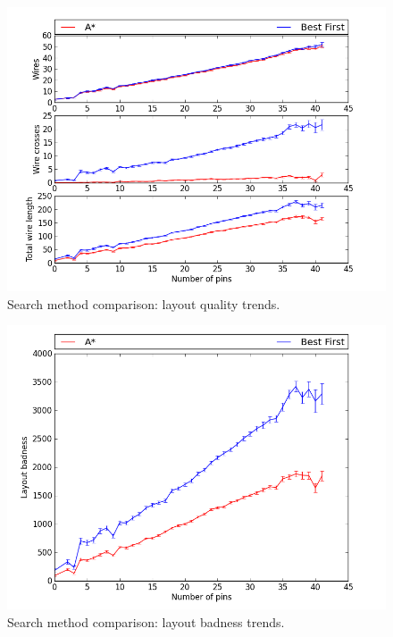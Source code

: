 \begin{figure}[H]
\begin{center}
\includegraphics[width=\textwidth]{Images/search_quality_trend_comparison.png}
\caption{Search method comparison: layout quality trends.}
\label{fig:search_quality_trend}
\end{center}
\end{figure}

\begin{figure}[H]
\begin{center}
\includegraphics[width=\textwidth]{Images/search_badness_trend_comparison.png}
\caption{Search method comparison: layout badness trends.}
\label{fig:search_badness_trend}
\end{center}
\end{figure}


